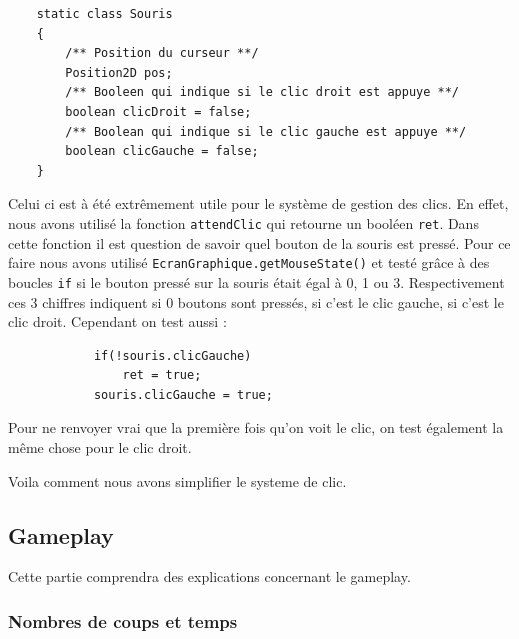 \documentclass[]{article}
\newcommand{\variable}[1]{\noindent \texttt{#1}}
\begin{document}
\begin{lstlisting}
    static class Souris
    {
        /** Position du curseur **/
        Position2D pos;
        /** Booleen qui indique si le clic droit est appuye **/
        boolean clicDroit = false;
        /** Boolean qui indique si le clic gauche est appuye **/
        boolean clicGauche = false;
    }
\end{lstlisting}
Celui ci est à été extrêmement utile pour le système de gestion des clics. En effet, 
nous avons utilisé la fonction \variable{attendClic} qui retourne un booléen \variable{ret}. Dans cette fonction il est question de savoir quel bouton de la souris est pressé. Pour ce faire nous avons utilisé \variable{EcranGraphique.getMouseState()} et testé grâce à des boucles \variable{if} si le bouton pressé sur la souris était égal à 0, 1 ou 3. Respectivement ces 3 chiffres indiquent si 0 boutons sont pressés, si c'est le clic gauche, si c'est le clic droit. Cependant on test aussi : 
\begin{lstlisting}
            if(!souris.clicGauche)
                ret = true;
            souris.clicGauche = true;
\end{lstlisting}
 Pour ne renvoyer vrai que la première fois qu'on voit le clic, on test également la même chose pour le clic droit. 

Voila comment nous avons simplifier le systeme de clic.


\subsection{Gameplay}

Cette partie comprendra des explications concernant le gameplay. 

\subsubsection{Nombres de coups et temps}
\end{document}
